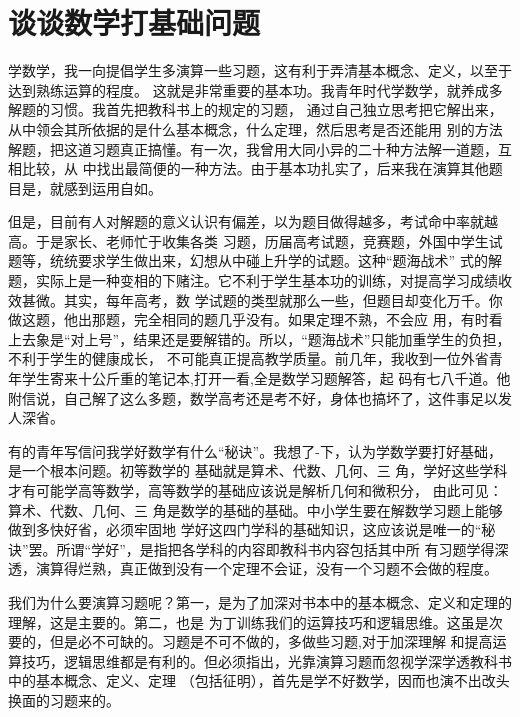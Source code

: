 \documentclass[twoside,openright,headings=optiontohead]{ctexbook} %
\begin{document}
{\hypertarget{ux8c08ux8c08ux6570ux5b66ux6253ux57faux7840ux95eeux9898}{%
\chapter*{谈谈数学打基础问题}\label{ux8c08ux8c08ux6570ux5b66ux6253ux57faux7840ux95eeux9898}}

学数学，我一向提倡学生多演算一些习题，这有利于弄清基本概念、定义，以至于达到熟练运算的程度。
这就是非常重要的基本功。我青年时代学数学，就养成多解题的习惯。我首先把教科书上的规定的习题，
通过自己独立思考把它解出来，从中领会其所依据的是什么基本概念，什么定理，然后思考是否还能用
别的方法解题，把这道习题真正搞懂。有一次，我曾用大同小异的二十种方法解一道题，互相比较，从
中找出最简便的一种方法。由于基本功扎实了，后来我在演算其他题目是，就感到运用自如。

伹是，目前有人对解题的意义认识有偏差，以为题目做得越多，考试命中率就越高。于是家长、老师忙于收集各类
习题，历届高考试题，竞赛题，外国中学生试题等，统统要求学生做出来，幻想从中碰上升学的试题。这种``题海战术''
式的解题，实际上是一种变相的下赌注。它不利于学生基本功的训练，对提高学习成绩收效甚微。其实，每年高考，数
学试题的类型就那么一些，但题目却变化万千。你做这题，他出那题，完全相同的题几乎没有。如果定理不熟，不会应
用，有时看上去象是``对上号''，结果还是要解错的。所以，``题海战术''只能加重学生的负担，不利于学生的健康成长，
不可能真正提高教学质量。前几年，我收到一位外省青年学生寄来十公斤重的笔记本,打开一看,全是数学习题解答，起
码有七八千道。他附信说，自己解了这么多题，数学高考还是考不好，身体也搞坏了，这件事足以发人深省。

有的青年写信问我学好数学有什么``秘诀''。我想了-下，认为学数学要打好基础，是一个根本问题。初等数学的
基础就是算术、代数、几何、三 角，学好这些学科才有可能学高等数学，高等数学的基础应该说是解析几何和微积分，
由此可见：算术、代数、几何、三 角是数学的基础的基础。中小学生要在解数学习题上能够做到多快好省，必须牢固地
学好这四门学科的基础知识，这应该说是唯一的``秘诀''罢。所谓``学好''，是指把各学科的内容即教科书内容包括其中所
有习题学得深透，演算得烂熟，真正做到没有一个定理不会证，没有一个习题不会做的程度。

我们为什么要演算习题呢？第一，是为了加深对书本中的基本概念、定义和定理的理解，这是主要的。第二，也是
为丁训练我们的运算技巧和逻辑思维。这虽是次要的，但是必不可缺的。习题是不可不做的，多做些习题,对于加深理解
和提高运算技巧，逻辑思维都是有利的。但必须指出，光靠演算习题而忽视学深学透教科书中的基本概念、定义、定理
（包括征明），首先是学不好数学，因而也演不出改头换面的习题来的。

}
\end{document}
